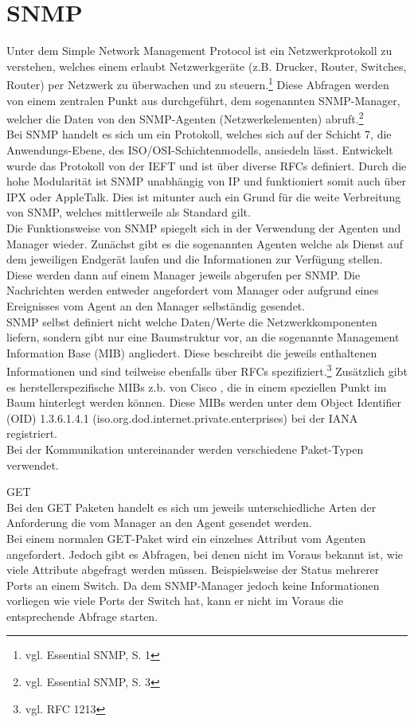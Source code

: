 \section{SNMP}
\label{sec:snmp}
Unter dem Simple Network Management Protocol ist ein Netzwerkprotokoll zu verstehen, welches einem erlaubt Netzwerkgeräte (z.B. Drucker, Router, Switches, Router) per Netzwerk zu überwachen und zu steuern.\footnote{vgl. Essential SNMP, S. 1}
Diese Abfragen werden von einem zentralen Punkt aus durchgeführt, dem sogenannten SNMP-Manager, welcher die Daten von den SNMP-Agenten (Netzwerkelementen) abruft.\footnote{vgl. Essential SNMP, S. 3}\\
Bei SNMP handelt es sich um ein Protokoll, welches sich auf der Schicht 7, die Anwendungs-Ebene, des ISO/OSI-Schichtenmodells, ansiedeln lässt.
Entwickelt wurde das Protokoll von der IEFT und ist über diverse RFCs definiert.
Durch die hohe Modularität ist SNMP unabhängig von IP und funktioniert somit auch über IPX oder AppleTalk. Dies ist mitunter auch ein Grund für die weite Verbreitung von SNMP, welches mittlerweile als Standard gilt.\\
Die Funktionsweise von  SNMP spiegelt sich in der Verwendung der Agenten und Manager wieder.
Zunächst gibt es die sogenannten Agenten welche als Dienst auf dem jeweiligen Endgerät laufen und die Informationen zur Verfügung stellen. Diese werden dann auf einem Manager jeweils abgerufen per SNMP. Die Nachrichten werden entweder angefordert vom Manager oder aufgrund eines Ereignisses vom Agent an den Manager selbständig gesendet.\\
SNMP selbst definiert nicht welche Daten/Werte die Netzwerkkomponenten liefern, sondern gibt nur eine Baumstruktur vor, an die sogenannte Management Information Base (MIB) angliedert.
Diese beschreibt die jeweils enthaltenen Informationen und sind teilweise ebenfalls über RFCs spezifiziert.\footnote{vgl. RFC 1213} Zusätzlich gibt es herstellerspezifische MIBs z.b. von Cisco , die in einem speziellen Punkt im Baum hinterlegt werden können. Diese MIBs werden unter dem  Object Identifier (OID) 1.3.6.1.4.1 (iso.org.dod.internet.private.enterprises) bei der IANA registriert.\\
Bei der Kommunikation untereinander werden verschiedene Paket-Typen verwendet.

GET\\

Bei den GET Paketen handelt es sich um jeweils unterschiedliche Arten der Anforderung die vom Manager an den Agent gesendet werden.\\
Bei einem normalen GET-Paket wird ein einzelnes Attribut vom Agenten angefordert. Jedoch gibt es Abfragen, bei denen nicht im Voraus bekannt ist, wie viele Attribute abgefragt werden müssen. Beispielsweise der Status mehrerer Ports an einem Switch. Da dem SNMP-Manager jedoch keine Informationen vorliegen wie viele Ports der Switch hat, kann er nicht im Voraus die entsprechende Abfrage starten.\\

